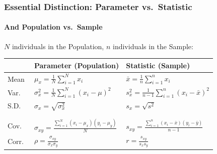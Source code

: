 \documentclass[handout]{beamer}
\begin{document}
\begin{frame}

\frametitle{Essential Distinction: Parameter vs.\ Statistic}
\framesubtitle{And Population vs.\ Sample}
$N$ individuals in the Population, $n$ individuals in the Sample:

\vspace{1em}
\small
\begin{tabular}{l|l|l}
	&\textbf{Parameter} (Population)&\textbf{Statistic} (Sample)\\
	\hline
	Mean&$\displaystyle\mu_x = \frac{1}{N} \sum_{i=1}^N x_i$& $\displaystyle\bar{x} = \frac{1}{n} \sum_{i=1}^n x_i$ \\
	Var.\ &$\displaystyle \sigma_x^2 = \frac{1}{N}\sum_{i=1}^N (x_i - \mu)^2$ &$\displaystyle s_x^2 = \frac{1}{n-1}\sum_{i=1}^n(x_i - \bar{x})^2$\\
	S.D.\ &$\sigma_x = \sqrt{\sigma_x^2}$ &$s_x = \sqrt{s^2}$ \\
	&&\\
	\hline
	&&\\
	\alert{Cov.\ }&\alert{$\displaystyle \sigma_{xy} = \frac{\sum_{i=1}^N(x_i - \mu_x)(y_i - \mu_y)}{N}$} &\alert{$\displaystyle s_{xy} = \frac{\sum_{i=1}^n(x_i - \bar{x})(y_i - \bar{y})}{n-1}$}\\
	\alert{Corr.\ } & \alert{$\displaystyle \rho = \frac{\sigma_{xy}}{\sigma_x \sigma_y}$}& \alert{$\displaystyle r = \frac{s_{xy}}{s_x s_y}$}
\end{tabular}

\end{frame}
\end{document}
